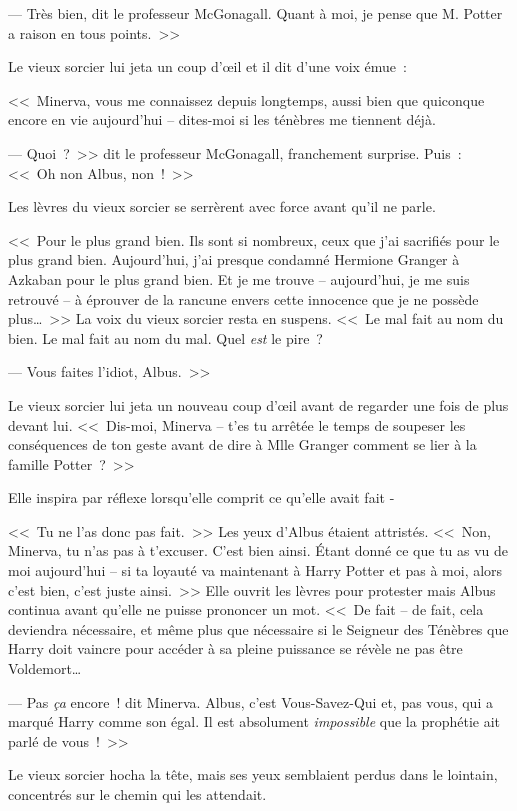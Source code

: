 --- Très bien, dit le professeur McGonagall. Quant à moi, je pense que M. Potter a raison en tous points.~>>

Le vieux sorcier lui jeta un coup d'œil et il dit d'une voix émue~:

<<~Minerva, vous me connaissez depuis longtemps, aussi bien que quiconque encore en vie aujourd'hui -- dites-moi si les ténèbres me tiennent déjà.

--- Quoi~?~>> dit le professeur McGonagall, franchement surprise. Puis~: <<~Oh non Albus, non~!~>>

Les lèvres du vieux sorcier se serrèrent avec force avant qu'il ne parle.

<<~Pour le plus grand bien. Ils sont si nombreux, ceux que j'ai sacrifiés pour le plus grand bien. Aujourd'hui, j'ai presque condamné Hermione Granger à Azkaban pour le plus grand bien. Et je me trouve -- aujourd'hui, je me suis retrouvé -- à éprouver de la rancune envers cette innocence que je ne possède plus…~>> La voix du vieux sorcier resta en suspens. <<~Le mal fait au nom du bien. Le mal fait au nom du mal. Quel \emph{est} le pire~?

--- Vous faites l'idiot, Albus.~>>

Le vieux sorcier lui jeta un nouveau coup d'œil avant de regarder une fois de plus devant lui. <<~Dis-moi, Minerva -- t'es tu arrêtée le temps de soupeser les conséquences de ton geste avant de dire à Mlle Granger comment se lier à la famille Potter~?~>>

Elle inspira par réflexe lorsqu'elle comprit ce qu'elle avait fait -

<<~Tu ne l'as donc pas fait.~>> Les yeux d'Albus étaient attristés. <<~Non, Minerva, tu n'as pas à t'excuser. C'est bien ainsi. Étant donné ce que tu as vu de moi aujourd'hui -- si ta loyauté va maintenant à Harry Potter et pas à moi, alors c'est bien, c'est juste ainsi.~>> Elle ouvrit les lèvres pour protester mais Albus continua avant qu'elle ne puisse prononcer un mot. <<~De fait -- de fait, cela deviendra nécessaire, et même plus que nécessaire si le Seigneur des Ténèbres que Harry doit vaincre pour accéder à sa pleine puissance se révèle ne pas être Voldemort…

--- Pas \emph{ça} encore~! dit Minerva. Albus, c'est Vous-Savez-Qui et, pas vous, qui a marqué Harry comme son égal. Il est absolument \emph{impossible} que la prophétie ait parlé de vous~!~>>

Le vieux sorcier hocha la tête, mais ses yeux semblaient perdus dans le lointain, concentrés sur le chemin qui les attendait.

